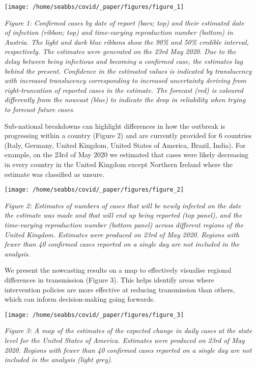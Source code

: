 \documentclass[]{article}
\begin{document}
\texttt{[image: /home/seabbs/covid/\_paper/figures/figure\_1]}

\emph{Figure 1: Confirmed cases by date of report (bars; top) and their
estimated date of infection (ribbon; top) and time-varying reproduction
number (bottom) in Austria. The light and dark blue ribbons show the
90\% and 50\% credible interval, respectively. The estimates were
generated on the 23rd May 2020. Due to the delay between being
infectious and becoming a confirmed case, the estimates lag behind the
present. Confidence in the estimated values is indicated by translucency
with increased translucency corresponding to increased uncertainty
deriving from right-truncation of reported cases in the estimate. The
forecast (red) is coloured differently from the nowcast (blue) to
indicate the drop in reliability when trying to forecast future cases.}

Sub-national breakdowns can highlight differences in how the outbreak is
progressing within a country (Figure 2) and are currently provided for 6
countries (Italy, Germany, United Kingdom, United States of America,
Brazil, India). For example, on the 23rd of May 2020 we estimated that
cases were likely decreasing in every country in the United Kingdom
except Northern Ireland where the estimate was classified as unsure.

\texttt{[image: /home/seabbs/covid/\_paper/figures/figure\_2]}

\emph{Figure 2: Estimates of numbers of cases that will be newly
infected on the date the estimate was made and that will end up being
reported (top panel), and the time-varying reproduction number (bottom
panel) across different regions of the United Kingdom. Estimates were
produced on 23rd of May 2020. Regions with fewer than 40 confirmed cases
reported on a single day are not included in the analysis.}

We present the nowcasting results on a map to effectively visualise
regional differences in transmission (Figure 3). This helps identify
areas where intervention policies are more effective at reducing
transmission than others, which can inform decision-making going
forwards.

\texttt{[image: /home/seabbs/covid/\_paper/figures/figure\_3]}

\emph{Figure 3: A map of the estimates of the expected change in daily
cases at the state level for the United States of America. Estimates
were produced on 23rd of May 2020. Regions with fewer than 40 confirmed
cases reported on a single day are not included in the analysis (light
grey).}
\end{document}
